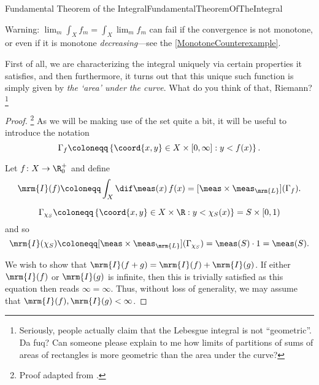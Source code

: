 \begin{thm}{Fundamental Theorem of the Integral}{FundamentalTheoremOfTheIntegral}
\begin{rmk}
\end{rmk}
\begin{wrn}
Warning:  $\lim _m\int _Xf_m=\int _X\lim _m f_m$ can fail if the convergence is not monotone, or even if it is monotone \emph{decreasing}---see the \cref{MonotoneCounterexample}.
\end{wrn}
\begin{rmk}
First of all, we are characterizing the integral uniquely via certain properties it satisfies, and then furthermore, it turns out that this unique such function is simply given by \emph{the `area' under the curve}.  What do you think of that, Riemann?\footnote{Seriously, people actually claim that the Lebesgue integral is not ``geometric''.  Da fuq?  Can someone please explain to me how limits of partitions of sums of areas of rectangles is more geometric than the area under the curve?}
\end{rmk}
\begin{proof}\footnote{Proof adapted from \cite[pg.~377]{Pugh}.}
As we will be making use of the set quite a bit, it will be useful to introduce the notation
\begin{equation}
\Gamma _f\coloneqq \left\{ \coord{x,y}\in X\times [0,\infty ]:y<f(x)\right\} .
\end{equation}

Let $f\colon X\rightarrow \R _0^+$ and define
\begin{equation}
\mrm{I}(f)\coloneqq \int _X\dif \meas (x)\, f(x)=[\meas \times \meas _{\mrm{L}}](\Gamma _f) .
\end{equation}

\begin{equation}
\Gamma _{\chi _S}\coloneqq \left\{ \coord{x,y}\in X\times \R :y<\chi _S(x)\right\} =S\times [0,1)
\end{equation}
and so
\begin{equation}
\mrm{I}(\chi _S)\coloneqq [\meas \times \meas _{\mrm{L}}](\Gamma _{\chi _S})=\meas (S)\cdot 1=\meas (S).
\end{equation}

We wish to show that $\mrm{I}(f+g)=\mrm{I}(f)+\mrm{I}(g)$.  If either $\mrm{I}(f)$ or $\mrm{I}(g)$ is infinite, then this is trivially satisfied as this equation then reads $\infty =\infty$.  Thus, without loss of generality, we may assume that $\mrm{I}(f),\mrm{I}(g)<\infty$.


\end{proof}
\end{thm}
